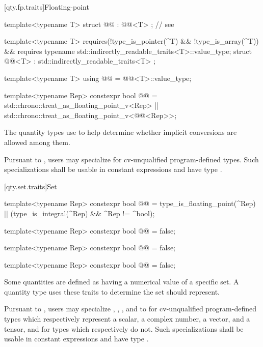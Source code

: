 [qty.fp.traits]{Floating-point}

\begin{itemdecl}
template<typename T>
struct @@ : @@<T> {}; // see 

template<typename T>
  requires(!type_is_pointer(^T) && !type_is_array(^T)) &&
          requires { typename std::indirectly_readable_traits<T>::value_type; }
struct @@<T> : std::indirectly_readable_traits<T> {};

template<typename T>
using @@ = @@<T>::value_type;

template<typename Rep>
constexpr bool @@ =
  std::chrono::treat_as_floating_point_v<Rep> ||
  std::chrono::treat_as_floating_point_v<@@<Rep>>;
\end{itemdecl}

\begin{itemdescr}
\pnum
The quantity types use 
to help determine whether implicit conversions are allowed among them.

\pnum
\remarks
Pursuant to ,
users may specialize 
for cv-unqualified program-defined types.
Such specializations shall be usable in constant expressions
and have type .
\end{itemdescr}

[qty.set.traits]{Set}

\begin{itemdecl}
template<typename Rep>
constexpr bool @@ =
  type_is_floating_point(^Rep) || (type_is_integral(^Rep) && ^Rep != ^bool);

template<typename Rep>
constexpr bool @@ = false;

template<typename Rep>
constexpr bool @@ = false;

template<typename Rep>
constexpr bool @@ = false;
\end{itemdecl}

\begin{itemdescr}
\pnum
Some quantities are defined as having a numerical value of a specific set.
A quantity type  uses these traits
to determine the set  should represent.

\pnum
\remarks
Pursuant to ,
users may specialize , , , and  to 
for cv-unqualified program-defined types
which respectively represent
a scalar,
a complex number,
a vector, and
a tensor,
and  for types which respectively do not.
Such specializations shall be usable in constant expressions
and have type .
\end{itemdescr}

